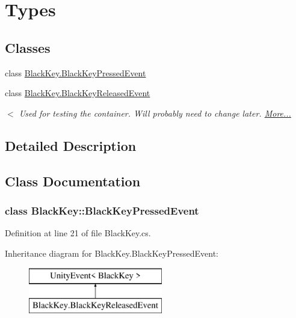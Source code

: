 \hypertarget{group___black_key_types}{}\section{Types}
\label{group___black_key_types}
\subsection*{Classes}
\begin{DoxyCompactItemize}
\item 
class \hyperlink{group___black_key_types_class_black_key_1_1_black_key_pressed_event}{Black\+Key.\+Black\+Key\+Pressed\+Event}
\item 
class \hyperlink{group___black_key_types_class_black_key_1_1_black_key_released_event}{Black\+Key.\+Black\+Key\+Released\+Event}
\begin{DoxyCompactList}\small\item\em $<$ Used for testing the container. Will probably need to change later.  \hyperlink{group___black_key_types_class_black_key_1_1_black_key_released_event}{More...}\end{DoxyCompactList}\end{DoxyCompactItemize}


\subsection{Detailed Description}


\subsection{Class Documentation}
\label{class_black_key_1_1_black_key_pressed_event}
\subsubsection{class Black\+Key\+:\+:Black\+Key\+Pressed\+Event}


Definition at line 21 of file Black\+Key.\+cs.

Inheritance diagram for Black\+Key.\+Black\+Key\+Pressed\+Event\+:\begin{figure}[H]
\begin{center}
\leavevmode
\includegraphics[height=2.000000cm]{group___black_key_types}
\end{center}
\end{figure}
\label{class_black_key_1_1_black_key_released_event}
